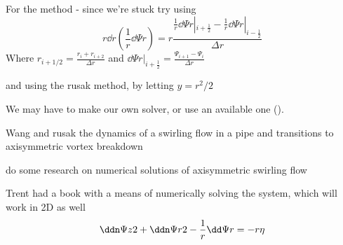 \documentclass{X:/Documents/Coding/Latex/myreport}
\begin{document}
\clearpage













For the method - since we're stuck
try using
\[r\dd{}r \left(\frac1r \dd \Psi r\right) = r\frac{\frac1r \dd\Psi r|_{i+\frac12} - \frac1r \dd{\Psi}{r}|_{i-\frac12}}{\Delta r}\]
Where $r_{i+1/2} = \frac{r_i + r_{i+2}}{\Delta r}$ and $\dd\Psi r |_{i+\frac12} = \frac{\Psi_{i+1} - \Psi_i}{\Delta r}$

and using the rusak method, by letting $y = r^2/2$

We may have to make our own solver, or use an available one ().

Wang and rusak the dynamics of a swirling flow in a pipe and transitions to axisymmetric vortex breakdown

do some research on numerical solutions of axisymmetric swirling flow 



Trent had a book with a means of numerically solving the system, which will work in 2D as well
\[\ddn \Psi z 2 + \ddn \Psi r2 - \frac1r \dd \Psi r = - r \eta\]
\end{document}
